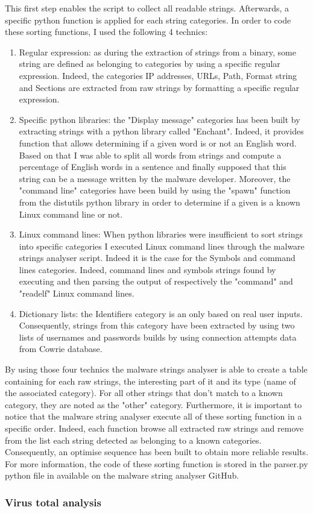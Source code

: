 This first step enables the script to collect all readable strings. Afterwards, a specific 
python function is applied for each string categories.
In order to code these sorting functions, I used the following 4 technics:
\begin{enumerate}
  \item Regular expression: as during the extraction of strings from a binary, some string
  are defined as belonging to categories by using a specific regular expression.
  Indeed, the categories IP addresses, URLs, Path, Format string and Sections are extracted
  from raw strings by formatting a specific regular expression.
  \item Specific python libraries: the "Display message" categories has been built by extracting
  strings with a python library called "Enchant". Indeed, it provides function that allows determining if a given word is or not an English word. Based on that I was able to split all
  words from strings and compute a percentage of English words in a sentence and finally
  supposed that this string can be a message written by the malware developer. Moreover, 
  the "command line" categories have been build by using the "spawn" function from the distutils
  python library in order to determine if a given is a known Linux command line or not.
  \item Linux command lines: When python libraries were insufficient to sort strings into specific categories I executed Linux command lines through the malware strings analyser
  script. Indeed it is the case for the Symbols and command lines categories. Indeed, command 
  lines and symbols strings found by executing and then parsing the output of respectively
  the "command" and "readelf" Linux command lines.
  \item Dictionary lists: the Identifiers category is an only based on real user inputs.
  Consequently, strings from this category have been extracted by using two lists of usernames
  and passwords builds by using connection attempts data from Cowrie database.
\end{enumerate}

By using those four technics the malware strings analyser is able to create a table containing
for each raw strings, the interesting part of it and its type (name of the associated category).
For all other strings that don't match to a known category, they are noted as the "other" category.
Furthermore, it is important to notice that the malware string analyser execute all of these 
sorting function in a specific order. Indeed, each function browse all extracted raw strings
and remove from the list each string detected as belonging to a known categories.
Consequently, an optimise sequence has been built to obtain more reliable results.
For more information, the code of these sorting function is stored in the parser.py python
file in available on the malware string analyser GitHub.

\subsubsection{Virus total analysis} %

\paragraph{}


